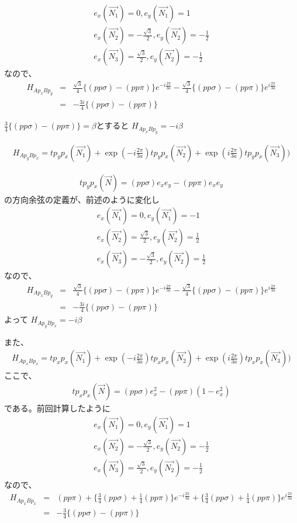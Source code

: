 \documentclass{article}
\begin{document}
\begin{eqnarray}
e_x(\vec{N_1})=0, e_y(\vec{N_1})=1 \\
e_x(\vec{N_2})=-\frac{\sqrt{3}}{2}, e_y(\vec{N_2})=-\frac{1}{2} \\
e_x(\vec{N_3})=\frac{\sqrt{3}}{2}, e_y(\vec{N_2})=-\frac{1}{2}
\end{eqnarray}
なので、
\begin{eqnarray}
H_{Ap_x Bp_y}&=&\frac{\sqrt{3}}{4}\{ (pp\sigma)-(pp\pi)\}e^{
-i\frac{2\pi}{3a}}-\frac{\sqrt{3}}{4}\{ (pp\sigma)-(pp\pi)\}e^{i\frac{2\pi}{3a}}
\\ \nonumber
&=& -\frac{3i}{4}\{ (pp\sigma)-(pp\pi)\}
\end{eqnarray}

$\frac{3}{4}\{ (pp\sigma)-(pp\pi)\}=\beta$とすると
$H_{Ap_x Bp_y}=-i\beta$


\begin{eqnarray}
H_{Ap_y Bp_x}=tp_yp_x(\vec{N_1})+\exp (-i\frac{2\pi}{3a})tp_yp_x(\vec{N_2})+\exp
(i\frac{2\pi}{3a})tp_yp_x(\vec{N_3}))
\end{eqnarray}

\begin{eqnarray}
tp_yp_x(\vec{N})=(pp\sigma)e_xe_y -(pp\pi)e_xe_y
\end{eqnarray}
の方向余弦の定義が、前述のように変化し
\begin{eqnarray}
e_x(\vec{N_1})=0, e_y(\vec{N_1})=-1 \\
e_x(\vec{N_2})=\frac{\sqrt{3}}{2}, e_y(\vec{N_2})=\frac{1}{2} \\
e_x(\vec{N_3})=-\frac{\sqrt{3}}{2}, e_y(\vec{N_2})=\frac{1}{2}
\end{eqnarray}
なので、
\begin{eqnarray}
H_{Ap_x Bp_y}&=&\frac{\sqrt{3}}{4}\{ (pp\sigma)-(pp\pi)\}e^{
-i\frac{2\pi}{3a}}-\frac{\sqrt{3}}{4}\{ (pp\sigma)-(pp\pi)\}e^{i\frac{2\pi}{3a}}
\\ \nonumber
&=& -\frac{3i}{4}\{ (pp\sigma)-(pp\pi)\}
\end{eqnarray}
よって
$H_{Ap_yBp_x}=-i\beta$

また、
\begin{eqnarray}
H_{Ap_x Bp_x}=tp_xp_x(\vec{N_1})+\exp (-i\frac{2\pi}{3a})tp_xp_x(\vec{N_2})+\exp
(i\frac{2\pi}{3a})tp_xp_x(\vec{N_3}))
\end{eqnarray}
ここで、
\begin{eqnarray}
tp_xp_x(\vec{N})=(pp\sigma)e^2_x -(pp\pi)(1-e^2_x)
\end{eqnarray}
である。前回計算したように
\begin{eqnarray}
e_x(\vec{N_1})=0, e_y(\vec{N_1})=1 \\
e_x(\vec{N_2})=-\frac{\sqrt{3}}{2}, e_y(\vec{N_2})=-\frac{1}{2} \\
e_x(\vec{N_3})=\frac{\sqrt{3}}{2}, e_y(\vec{N_2})=-\frac{1}{2}
\end{eqnarray}
なので、
\begin{eqnarray}
H_{Ap_x Bp_x}&=&(pp\pi)+\{ \frac{3}{4}(pp\sigma)+ \frac{1}{4}(pp\pi)\}e^{
-i\frac{2\pi}{3a}}+\{\frac{3}{4}
(pp\sigma)+\frac{1}{4}(pp\pi)\}e^{i\frac{2\pi}{3a}}  \nonumber \\
&=& -\frac{3}{4}\{ (pp\sigma)-(pp\pi)\}
\end{eqnarray}
\end{document}
